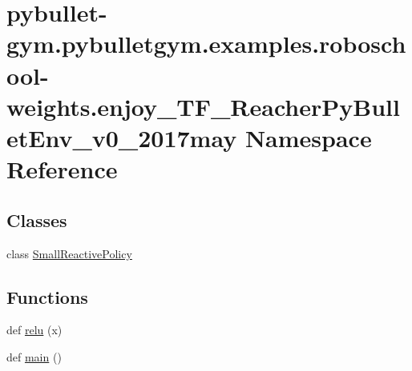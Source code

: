 \hypertarget{namespacepybullet-gym_1_1pybulletgym_1_1examples_1_1roboschool-weights_1_1enjoy___t_f___reacher_py_bullet_env__v0__2017may}{}\section{pybullet-\/gym.pybulletgym.\+examples.\+roboschool-\/weights.enjoy\+\_\+\+T\+F\+\_\+\+Reacher\+Py\+Bullet\+Env\+\_\+v0\+\_\+2017may Namespace Reference}
\label{namespacepybullet-gym_1_1pybulletgym_1_1examples_1_1roboschool-weights_1_1enjoy___t_f___reacher_py_bullet_env__v0__2017may}
\subsection*{Classes}
\begin{DoxyCompactItemize}
\item 
class \hyperlink{classpybullet-gym_1_1pybulletgym_1_1examples_1_1roboschool-weights_1_1enjoy___t_f___reacher_py_bcdf4f2e33e3a7496b5cf98d8c606ee5b}{Small\+Reactive\+Policy}
\end{DoxyCompactItemize}
\subsection*{Functions}
\begin{DoxyCompactItemize}
\item 
def \hyperlink{namespacepybullet-gym_1_1pybulletgym_1_1examples_1_1roboschool-weights_1_1enjoy___t_f___reacher_py_bullet_env__v0__2017may_a9418248456f3c08fbdac9bb8b07214e4}{relu} (x)
\item 
def \hyperlink{namespacepybullet-gym_1_1pybulletgym_1_1examples_1_1roboschool-weights_1_1enjoy___t_f___reacher_py_bullet_env__v0__2017may_a9a0644e87fb9024d585987138690f27b}{main} ()
\end{DoxyCompactItemize}
